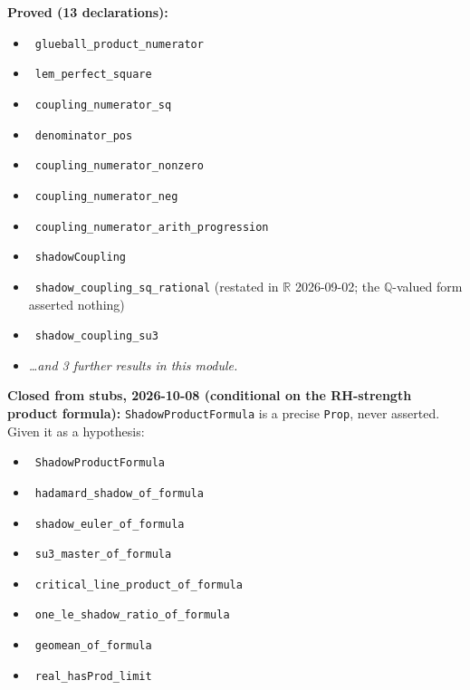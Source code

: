 \documentclass{report}
\theoremstyle{definition}
\begin{document}
\begin{itemize}
\begin{itemize}
\noindent\textbf{Proved (13 declarations):}
\begin{itemize}
  \item {}\leanok\ \texttt{glueball\_product\_numerator}
  \item {}\leanok\ \texttt{lem\_perfect\_square}
  \item {}\leanok\ \texttt{coupling\_numerator\_sq}
  \item {}\leanok\ \texttt{denominator\_pos}
  \item {}\leanok\ \texttt{coupling\_numerator\_nonzero}
  \item {}\leanok\ \texttt{coupling\_numerator\_neg}
  \item {}\leanok\ \texttt{coupling\_numerator\_arith\_progression}
  \item {}\leanok\ \texttt{shadowCoupling}
  \item {}\leanok\ \texttt{shadow\_coupling\_sq\_rational} (restated in $\mathbb{R}$ 2026-09-02; the $\mathbb{Q}$-valued form asserted nothing)
  \item {}\leanok\ \texttt{shadow\_coupling\_su3}
  \item \emph{\ldots and 3 further results in this module.}
\end{itemize}

\noindent\textbf{Closed from stubs, 2026-10-08 (conditional on the RH-strength product formula):}
\texttt{ShadowProductFormula} is a precise \texttt{Prop}, never asserted. Given it as a hypothesis:
\begin{itemize}
  \item {}\leanok\ \texttt{ShadowProductFormula}
  \item {}\leanok\ \texttt{hadamard\_shadow\_of\_formula}
  \item {}\leanok\ \texttt{shadow\_euler\_of\_formula}
  \item {}\leanok\ \texttt{su3\_master\_of\_formula}
  \item {}\leanok\ \texttt{critical\_line\_product\_of\_formula}
  \item {}\leanok\ \texttt{one\_le\_shadow\_ratio\_of\_formula}
  \item {}\leanok\ \texttt{geomean\_of\_formula}
  \item {}\leanok\ \texttt{real\_hasProd\_limit}
\end{itemize}


\end{itemize}
\end{itemize}
\end{document}

